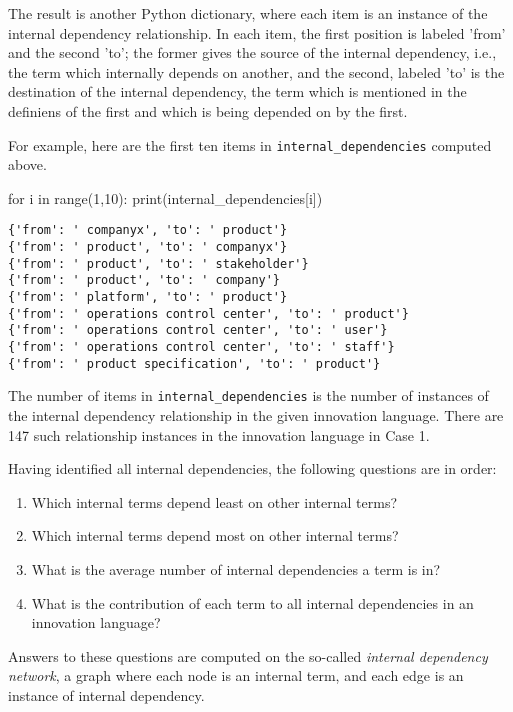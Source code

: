The result is another Python dictionary, where each item is an instance of the internal dependency relationship. In each item, the first position is labeled 'from' and the second 'to'; the former gives the source of the internal dependency, i.e., the term which internally depends on another, and the second, labeled 'to' is the destination of the internal dependency, the term which is mentioned in the definiens of the first and which is being depended on by the first.

For example, here are the first ten items in \verb|internal_dependencies| computed above.

\begin{pycode}
for i in range(1,10): print(internal_dependencies[i])
\end{pycode}

\begin{lstlisting}[breaklines]
{'from': ' companyx', 'to': ' product'}
{'from': ' product', 'to': ' companyx'}
{'from': ' product', 'to': ' stakeholder'}
{'from': ' product', 'to': ' company'}
{'from': ' platform', 'to': ' product'}
{'from': ' operations control center', 'to': ' product'}
{'from': ' operations control center', 'to': ' user'}
{'from': ' operations control center', 'to': ' staff'}
{'from': ' product specification', 'to': ' product'}
\end{lstlisting}

The number of items in \verb|internal_dependencies| is the number of instances of the internal dependency relationship in the given innovation language. There are 147 such relationship instances in the innovation language in Case 1.

Having identified all internal dependencies, the following questions are in order:
\begin{enumerate}
	\item Which internal terms depend least on other internal terms?
	\item Which internal terms depend most on other internal terms?
	\item What is the average number of internal dependencies a term is in?
	\item What is the contribution of each term to all internal dependencies in an innovation language?
\end{enumerate}

Answers to these questions are computed on the so-called \textit{internal dependency network}, a graph where each node is an internal term, and each edge is an instance of internal dependency. 

